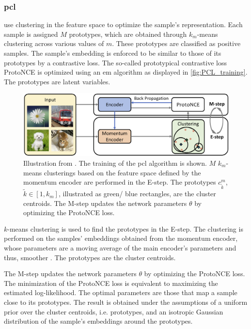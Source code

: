 \subsubsection{\acl{pcl}}\label{subsec:PCL}

\citet{PCL_2021} use clustering in the feature space to optimize the sample's representation.
Each sample is assigned $M$ prototypes, which are obtained through $k_m$-means clustering across various values of $m$.
These prototypes are classified as positive samples.
The sample's embedding is enforced to be similar to those of its prototypes by a contrastive loss.
The so-called prototypical contrastive loss ProtoNCE is optimized using an \ac{em} algorithm 
as displayed in \autoref{fig:PCL_training}.
The prototypes are latent variables.

\begin{figure}[!htb] %
    \centering
    \includegraphics[width=360pt]{images/PCL_training.png}
    \caption{Illustration from \citet{PCL_2021}.
    The training of the \ac{pcl} algorithm is shown.
    $M$ $k_m$-means clusterings based on the feature space defined by the momentum encoder 
    are performed in the E-step.
    The prototypes $c^m_{\tilde{k}}$, $\tilde{k} \in [1, k_m]$, illustrated as green/ blue rectangles, 
    are the cluster centroids.
    The M-step updates the network parameters $\theta$ by optimizing the ProtoNCE loss.
    }
    \label{fig:PCL_training}
\end{figure}

$k$-means clustering is used to find the prototypes in the E-step.
The clustering is performed on the samples' embeddings obtained from the momentum encoder, 
whose parameters are a moving average of the main encoder's parameters and thus, smoother \citep{PCL_2021}.
The prototypes are the cluster centroids.

The M-step updates the network parameters $\theta$ by optimizing the ProtoNCE loss.
The minimization of the ProtoNCE loss is equivalent to maximizing the estimated log-likelihood.
The optimal parameters are those that map a sample close to its prototypes.
The result is obtained under the assumptions of a uniform prior over the cluster centroids, i.e. prototypes,
and an isotropic Gaussian distribution of the sample's embeddings around the prototypes.

